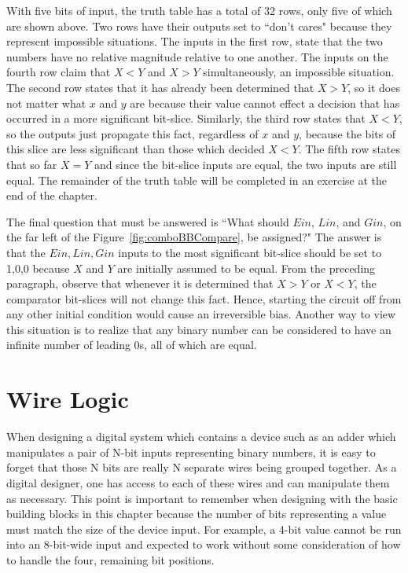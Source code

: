 With five bits of input, the truth table has a total of 32 rows, only
five of which are shown above.  Two rows have their outputs set to 
``don't cares" because they represent impossible situations.  The inputs
in the first row, state that the two numbers have no relative 
magnitude relative to one another.  The inputs on the fourth row 
claim that $X<Y$ and $X>Y$ simultaneously, an impossible situation.
The second row states that it has already been determined that $X>Y$,
so it does not matter what $x$ and $y$ are because their value cannot 
effect a decision that has occurred
in a more significant bit-slice.  Similarly, the third row states
that $X<Y$, so the outputs just propagate this fact, regardless 
of $x$ and $y$, because the bits of this slice are less significant
than those which decided $X<Y$.  The fifth row states that
so far $X=Y$ and since the bit-slice inputs are equal, the 
two inputs are still equal.  The remainder of the truth table will
be completed in an exercise at the end of the chapter.

The final question that must be answered is ``What should $Ein$, $Lin$,
and $Gin$, on the far left of the Figure~\ref{fig:comboBBCompare}, be assigned?"
The answer is that the $Ein, Lin,Gin$ inputs to the most significant bit-slice
should be set to 1,0,0 because $X$ and $Y$ are initially assumed to be equal.
From the preceding paragraph, observe that whenever it is determined
that $X>Y$ or $X<Y$, the comparator bit-slices will not change this 
fact.  Hence, starting the circuit off from any other initial condition
would cause an irreversible bias.  Another way to view this situation
is to realize that any binary number can be considered to have an infinite 
number of leading 0s, all of which are equal.



\section{Wire Logic}
When  designing a digital system which contains a device
such as an adder which manipulates a pair of N-bit inputs representing
binary numbers, it is easy to forget that those N bits are really
N separate wires being grouped together.  As a
digital designer, one has access to each of these wires
and can manipulate them as necessary.  This point is important
to remember when designing with the basic building
blocks in this chapter because the number of bits representing a 
value must match the size of the device input.  For example, 
a 4-bit value cannot be run into an 8-bit-wide input and 
expected to work without some consideration of how to
handle the four, remaining bit positions.

